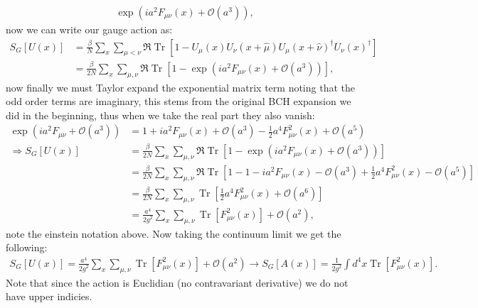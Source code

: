 \documentclass[english,twoside,openright]{UH_TCM_MSc}
\DeclareMathOperator{\Tr}{Tr}
\begin{document}
\begin{appendices}
\begin{align}
    \exp(ia^2F_{\mu\nu}(x)+\mathcal{O}(a^3)),
\end{align}
now we can write our gauge action as:
\begin{align}
    S_G[U(x)] &= \frac{\beta}{N}\sum_{x}\sum_{\mu <\nu}\Re\Tr[1-U_\mu(x)U_\nu(x+\hat{\mu})U_\mu(x+\hat\nu)^\dagger U_\nu(x)^\dagger] \\
    &=\frac{\beta}{2N}\sum_{x}\sum_{\mu,\nu}\Re\Tr[1-\exp(ia^2F_{\mu\nu}(x)+\mathcal{O}(a^3))],
\end{align}
now finally we must Taylor expand the exponential matrix term noting that the odd order terms are imaginary, this stems from the original BCH expansion we did in the beginning, thus when we take the real part they also vanish:
\begin{align}
    \exp(ia^2F_{\mu\nu}+\mathcal{O}(a^3)) &= 1 + ia^2 F_{\mu\nu}(x) + \mathcal{O}(a^3) - \frac{1}{2}a^4 F^2_{\mu\nu}(x) + \mathcal{O}(a^5) \\
    \Rightarrow S_G[U(x)] &=\frac{\beta}{2N}\sum_{x}\sum_{\mu,\nu}\Re\Tr[1-\exp(ia^2F_{\mu\nu}(x)+\mathcal{O}(a^3))] \\
    &=\frac{\beta}{2N}\sum_{x}\sum_{\mu,\nu}\Re\Tr[1-1 - ia^2 F_{\mu\nu}(x) - \mathcal{O}(a^3) + \frac{1}{2}a^4 F^2_{\mu\nu}(x) - \mathcal{O}(a^5)] \\
    &=\frac{\beta}{2N}\sum_{x}\sum_{\mu,\nu}\Tr[\frac{1}{2}a^4 F^2_{\mu\nu}(x) + \mathcal{O}(a^6)] \\
    &=\frac{a^4}{2g^2}\sum_{x}\sum_{\mu,\nu}\Tr[F^2_{\mu\nu}(x)]+\mathcal{O}(a^2),
\end{align}
note the einstein notation above. Now taking the continuum limit we get the following:
\begin{align}
    S_G[U(x)] = \frac{a^4}{2g^2}\sum_{x}\sum_{\mu,\nu}\Tr[F^2_{\mu\nu}(x)]+\mathcal{O}(a^2) \rightarrow  S_G[A(x)] = \frac{1}{2g^2}\int d^4 x\Tr[F^2_{\mu\nu}(x)].
\end{align}
Note that since the action is Euclidian (no contravariant derivative) we do not have upper indicies.
\end{appendices}
\end{document}
